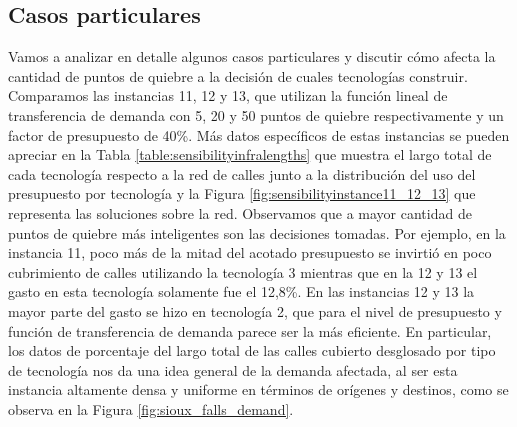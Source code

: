\clearpage
\subsection*{Casos particulares}

Vamos a analizar en detalle algunos casos particulares y discutir cómo afecta la cantidad de puntos de quiebre a la decisión de cuales tecnologías construir. Comparamos las instancias 11, 12 y 13, que utilizan la función lineal de transferencia de demanda con 5, 20 y 50 puntos de quiebre respectivamente y un factor de presupuesto de 40\%. Más datos específicos de estas instancias se pueden apreciar en la Tabla \ref{table:sensibilityinfralengths} que muestra el largo total de cada tecnología respecto a la red de calles junto a la distribución del uso del presupuesto por tecnología y la Figura \ref{fig:sensibilityinstance11_12_13} que representa las soluciones sobre la red. Observamos que a mayor cantidad de puntos de quiebre más inteligentes son las decisiones tomadas. Por ejemplo, en la instancia 11, poco más de la mitad del acotado presupuesto se invirtió en poco cubrimiento de calles utilizando la tecnología 3 mientras que en la 12 y 13 el gasto en esta tecnología solamente fue el 12,8\%. En las instancias 12 y 13 la mayor parte del gasto se hizo en tecnología 2, que para el nivel de presupuesto y función de transferencia de demanda parece ser la más eficiente. En particular, los datos de porcentaje del largo total de las calles cubierto desglosado por tipo de tecnología nos da una idea general de la demanda afectada, al ser esta instancia altamente densa y uniforme en términos de orígenes y destinos, como se observa en la Figura \ref{fig:sioux_falls_demand}.

